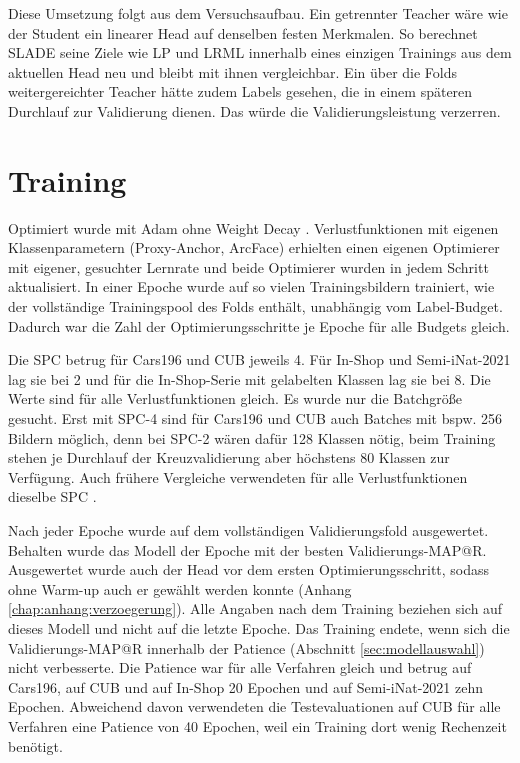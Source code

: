 Diese Umsetzung folgt aus dem Versuchsaufbau. Ein getrennter Teacher wäre wie der Student ein linearer Head auf denselben festen Merkmalen. So berechnet \ac{SLADE} seine Ziele wie \ac{LP} und \ac{LRML} innerhalb eines einzigen Trainings aus dem aktuellen Head neu und bleibt mit ihnen vergleichbar. Ein über die Folds weitergereichter Teacher hätte zudem Labels gesehen, die in einem späteren Durchlauf zur Validierung dienen. Das würde die Validierungsleistung verzerren. 

\section{Training}
\label{sec:training}

Optimiert wurde mit Adam ohne Weight Decay \cite{kingma_adam_2015}. Verlustfunktionen mit eigenen Klassenparametern (Proxy-Anchor, ArcFace) erhielten einen eigenen Optimierer mit eigener, gesuchter Lernrate und beide Optimierer wurden in jedem Schritt aktualisiert. In einer Epoche wurde auf so vielen Trainingsbildern trainiert, wie der vollständige Trainingspool des Folds enthält, unabhängig vom Label-Budget. Dadurch war die Zahl der Optimierungsschritte je Epoche für alle Budgets gleich.

Die \ac{SPC} betrug für Cars196 und \ac{CUB} jeweils 4. Für In-Shop und Semi-iNat-2021 lag sie bei 2 und für die In-Shop-Serie mit gelabelten Klassen lag sie bei 8. Die Werte sind für alle Verlustfunktionen gleich. Es wurde nur die Batchgröße gesucht. Erst mit \ac{SPC}-4 sind für Cars196 und \ac{CUB} auch Batches mit bspw. 256 Bildern möglich, denn bei \ac{SPC}-2 wären dafür 128 Klassen nötig, beim Training stehen je Durchlauf der Kreuzvalidierung aber höchstens 80 Klassen zur Verfügung. Auch frühere Vergleiche verwendeten für alle Verlustfunktionen dieselbe \ac{SPC} \cite{roth_revisiting_2020,musgrave_metric_2020}.

Nach jeder Epoche wurde auf dem vollständigen Validierungsfold ausgewertet. Behalten wurde das Modell der Epoche mit der besten Validierungs-\ac{MAP@R}. Ausgewertet wurde auch der Head vor dem ersten Optimierungsschritt, sodass ohne Warm-up auch er gewählt werden konnte (Anhang \ref{chap:anhang:verzoegerung}). Alle Angaben nach dem Training beziehen sich auf dieses Modell und nicht auf die letzte Epoche. Das Training endete, wenn sich die Validierungs-\ac{MAP@R} innerhalb der Patience (Abschnitt \ref{sec:modellauswahl}) nicht verbesserte. Die Patience war für alle Verfahren gleich und betrug auf Cars196, auf \ac{CUB} und auf In-Shop 20 Epochen und auf Semi-iNat-2021 zehn Epochen. Abweichend davon verwendeten die Testevaluationen auf \ac{CUB} für alle Verfahren eine Patience von 40 Epochen, weil ein Training dort wenig Rechenzeit benötigt.

